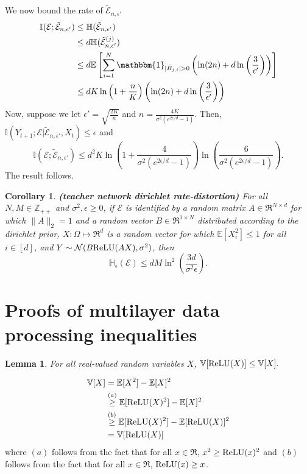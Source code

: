 \documentclass[twoside,11pt]{article}
\renewenvironment{proof}{\par\noindent{\bf Proof\ }}{\hfill\BlackBox\\[2mm]}
\newenvironment{proof}{\par\noindent{\bf Proof\ }}{\hfill\BlackBox\\[2mm]}
\newtheorem{lemma}[theorem]{Lemma}
\newtheorem{corollary}[theorem]{Corollary}
\def\environment{\mathcal{E}}
\def\proxy{\tilde{\environment}}
\def\normal{\mathcal{N}}
\def\var{\mathbb{V}}
\def\relu{{\rm ReLU}}
\def\E{\mathbb{E}}
\def\H{\mathbb{H}}
\def\I{\mathbb{I}}
\begin{document}
\begin{proof}
    We now bound the rate of $\proxy_{n, \epsilon'}$
    \begin{align*}
        \I(\environment;\proxy_{n, \epsilon'})
        & \leq \H(\proxy_{n, \epsilon'})\\
        & \leq d\H(\proxy^{(j)}_{n, \epsilon'})\\
        & \leq d \E\left[\sum_{i=1}^{N} \mathbbm{1}_{|\hat{B}_{j,i}| > 0} \left(\ln(2n) + d\ln\left(\frac{3}{\epsilon'}\right)\right) \right]\\
        & \leq dK\ln\left(1+\frac{n}{K}\right)\left(\ln(2n) + d\ln\left(\frac{3}{\epsilon'}\right)\right)
    \end{align*}
    Now, suppose we let $\epsilon' = \sqrt{\frac{2K}{n}}$ and $n = \frac{4K}{\sigma^2\left(e^{2\epsilon/d}-1\right)}$. Then, $\I(Y_{t+1};\environment|\proxy_{n,\epsilon'}, X_t) \leq \epsilon$ and 
    $$\I(\environment;\proxy_{n,\epsilon'}) \leq d^2K\ln\left(1+\frac{4}{\sigma^2\left(e^{2\epsilon/d}-1\right)}\right)\ln\left(\frac{6}{\sigma^2(e^{2\epsilon/d}-1)}\right).$$
    The result follows.
\end{proof}

\begin{corollary}{\bf (teacher network dirichlet rate-distortion)}
\label{th:nonparametric_singlelayer_rd}
    For all $N, M\in\mathbb{Z}_{++}$ and $\sigma^2, \epsilon \geq 0$, if $\environment$ is identified by a random matrix $A\in\Re^{N\times d}$ for which $\|A\|_2 = 1$ and a random vector $B\in\Re^{1\times N}$ distributed according to the dirichlet prior, $X:\Omega\mapsto\Re^d$ is a random vector for which $\E[X^2_i]\leq 1$ for all $i\in[d]$, and $Y\sim\normal(B \relu(AX), \sigma^2)$, then
    $$\H_\epsilon(\environment) \leq dM\ln^2\left(\frac{3d}{\sigma^2\epsilon}\right).$$
\end{corollary}

\section{Proofs of multilayer data processing inequalities}
\label{apdx:relu_dpe}
\begin{lemma}
    \label{le:relu_variance}
    For all real-valued random variables $X$,
    $\var[\relu(X)]\leq \var[X].$
\end{lemma}
\begin{proof}
    \begin{align*}
        \var[X]
        & = \E[X^2] - \E[X]^2\\
        & \overset{(a)}{\geq} \E[\relu(X)^2] - \E[X]^2\\
        & \overset{(b)}{\geq} \E[\relu(X)^2] - \E[\relu(X)]^2\\
        & = \var[\relu(X)]
    \end{align*}
    where $(a)$ follows from the fact that for all $x\in\Re$, $x^2 \geq \relu(x)^2$ and $(b)$ follows from the fact that for all $x\in\Re$, $\relu(x) \geq x$.
\end{proof}
\end{document}
